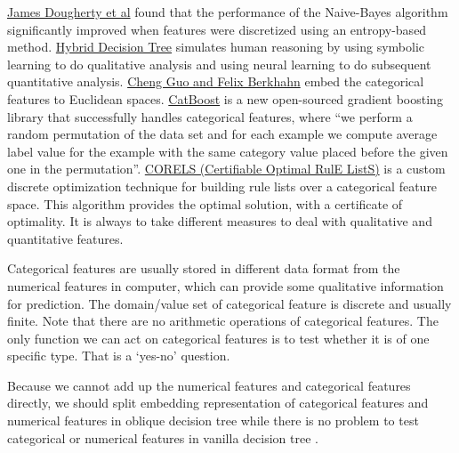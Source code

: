 \documentclass[UTF8]{article}
\begin{document}
\href{https://www.sciencedirect.com/science/article/pii/B9781558603776500323}{James Dougherty et al}
found that the performance of the Naive-Bayes algorithm significantly
improved when features were discretized using an entropy-based method.
\href{https://cs.nju.edu.cn/zhouzh/zhouzh.files/publication/kbs02.pdf}{Hybrid Decision Tree}
simulates human reasoning by using
symbolic learning to do qualitative analysis and using neural learning to do subsequent quantitative analysis.
\href{https://arxiv.org/abs/1604.06737}{Cheng Guo and Felix Berkhahn}
embed the categorical features to Euclidean spaces.
\href{http://learningsys.org/nips17/assets/papers/paper_11.pdf}{CatBoost}
is a new open-sourced gradient boosting library
that successfully handles categorical features, where
``we perform a random permutation of the data set and for each example we
compute average label value for the example with the same category value placed before the given
one in the permutation''.
\href{https://corels.eecs.harvard.edu/corels/index.html}{CORELS (Certifiable Optimal RulE ListS)}
is a custom discrete optimization technique for building rule lists over a categorical feature space.
This algorithm provides the optimal solution, with a certificate of optimality.
It is always to take different measures to deal with qualitative and quantitative features.

Categorical features are usually stored in different data format from the numerical features in computer,
which can provide some qualitative information for prediction.
The domain/value set of categorical feature is discrete and usually finite.
Note that there are no arithmetic operations of categorical features.
The only function we can act on categorical features is to test whether it is of one specific type.
That is a `yes-no' question.


Because we cannot add up the numerical features and categorical features directly,
we should split embedding representation of categorical features and numerical features in oblique decision tree
while there is no problem  to test categorical or numerical features in vanilla decision tree \footnotemark.
\end{document}
